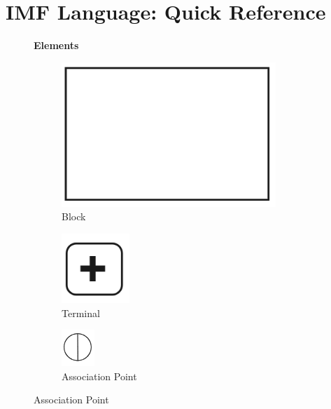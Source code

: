 \documentclass[../main.tex]{subfiles}
\begin{document}
\chapter{IMF Language: Quick Reference}
\label{ch:IMF visual language}

\begin{figure}
  \centering

  \textbf{Elements}\\[2ex]

  \begin{subfigure}[b]{0.2\textwidth} \centering
    \includegraphics[width=.7\textwidth]{img/IMFmanual-img012.png}
    \caption{Block}
  \end{subfigure}
  \hspace{1cm}
  \begin{subfigure}[b]{0.2\textwidth} \centering
    \includegraphics[width=.3\textwidth]{img/IMFmanual-img013.png}
    \caption{Terminal}
  \end{subfigure}
  \hspace{1cm}
  \begin{subfigure}[b]{0.2\textwidth} \centering
    \includegraphics[width=.3\textwidth]{img/IMFmanual-img014.png}
    \caption{Association Point}
  \end{subfigure}


\end{figure}
\end{document}
